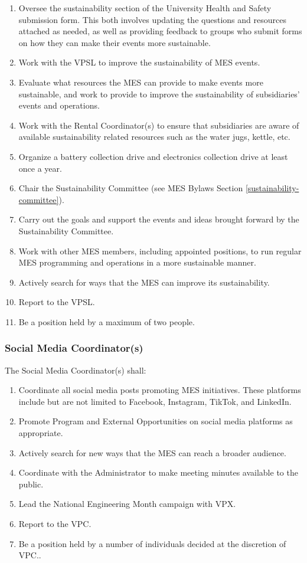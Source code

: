 \begin{enumerate}
 \item
  Oversee the sustainability section of the University Health and Safety submission form. This both involves updating the questions and resources attached as needed, as well as providing feedback to groups who submit forms on how they can make their events more sustainable.
 \item
  Work with the VPSL to improve the sustainability of MES events.
 \item
  Evaluate what resources the MES can provide to make events more sustainable, and work to provide to improve the sustainability of subsidiaries' events and operations.
 \item
  Work with the Rental Coordinator(s) to ensure that subsidiaries are aware of available sustainability related resources such as the water jugs, kettle, etc.
 \item
  Organize a battery collection drive and electronics collection drive at least once a year.
 \item
  Chair the Sustainability Committee (see MES Bylaws Section \ref{sustainability-committee}).
 \item
  Carry out the goals and support the events and ideas brought forward by the Sustainability Committee.
 \item
  Work with other MES members, including appointed positions, to run regular MES programming and operations in a more sustainable manner.
 \item
  Actively search for ways that the MES can improve its sustainability.
 \item
  Report to the VPSL.
 \item
  Be a position held by a maximum of two people.

\end{enumerate}

\subsubsection{Social Media Coordinator(s)}
\label{social-media-coordinators}
The Social Media Coordinator(s) shall:

\begin{enumerate}
 \item
  Coordinate all social media posts promoting MES initiatives. These platforms include but are not limited to Facebook, Instagram, TikTok, and LinkedIn.
 \item
  Promote Program and External Opportunities on social media platforms as appropriate.
 \item
  Actively search for new ways that the MES can reach a broader audience.
 \item
  Coordinate with the Administrator to make meeting minutes available to the public.
 \item
  Lead the National Engineering Month campaign with VPX.
 \item
  Report to the VPC.
 \item
  Be a position held by a number of individuals decided at the discretion of VPC..

\end{enumerate}

